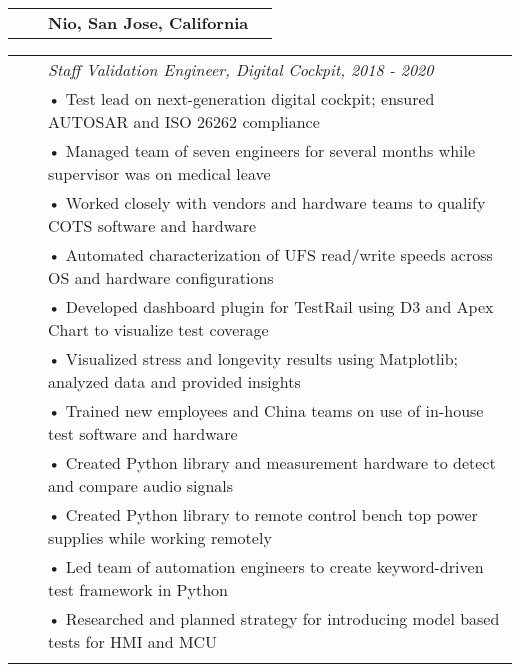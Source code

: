 \documentclass{minimal}
\begin{document}
\begin{tabular}{ p{1.5cm} p{1cm} p{16cm} >{\raggedleft\arraybackslash}p{3cm} }
& & \textbf{Nio, San Jose, California} & \\
\end{tabular}

\begin{tabular}{ p{1.5cm} p{1cm} p{16cm} }
& & \textit{Staff Validation Engineer, Digital Cockpit, 2018 - 2020}\\
& & • Test lead on next-generation digital cockpit; ensured AUTOSAR and ISO 26262 compliance\\
& & • Managed team of seven engineers for several months while supervisor was on medical leave\\
& & • Worked closely with vendors and hardware teams to qualify COTS software and hardware\\
& & • Automated characterization of UFS read/write speeds across OS and hardware configurations\\
& & • Developed dashboard plugin for TestRail using D3 and Apex Chart to visualize test coverage\\
& & • Visualized stress and longevity results using Matplotlib; analyzed data and provided insights\\
& & • Trained new employees and China teams on use of in-house test software and hardware\\
& & • Created Python library and measurement hardware to detect and compare audio signals\\
& & • Created Python library to remote control bench top power supplies while working remotely\\
& & • Led team of automation engineers to create keyword-driven test framework in Python\\
& & • Researched and planned strategy for introducing model based tests for HMI and MCU\\
& & \\
\end{tabular}
\end{document}
